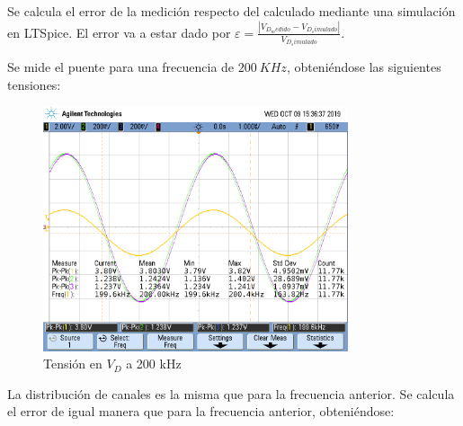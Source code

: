 Se calcula el error de la medición respecto del calculado mediante una simulación en LTSpice. El error va a estar dado por $\varepsilon = \frac{|V_{D_medido}-V_{D_simulado}|}{V_{D_simulado}}$.

Se mide el puente para una frecuencia de $200 \ KHz $, obteniéndose las siguientes tensiones:
\begin{figure}[H]
\centering
\includegraphics[width=0.8\textwidth,trim={0 2.2cm 0.1cm 1.75cm},clip]{Mediciones/Tensiones_200_KHz}
\caption{Tensión en $V_D$ a 200 kHz}
\label{fig:Tensiones_200_KHz}
\end{figure}
La distribución de canales es la misma que para la frecuencia anterior. Se calcula el error de igual manera que para la frecuencia anterior, obteniéndose:


